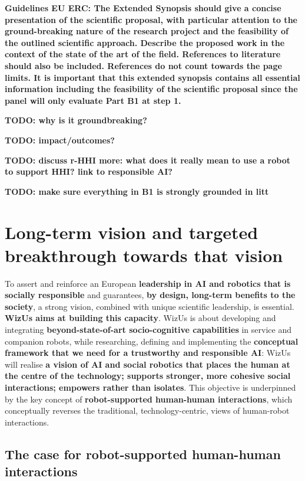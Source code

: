 \documentclass[11pt]{report}
\newcommand{\project}{WizUs\xspace}
\newcommand{\TODO}[1]{{\color{red}\textbf{TODO: #1}}}
\newcommand{\eu}[1]{{\color{teal}\textbf{Guidelines EU ERC: #1}}}
\begin{document}
\eu{The Extended Synopsis should give a concise presentation of the scientific
proposal, with particular attention to the ground-breaking nature of the
research project and the feasibility of the outlined scientific approach.
Describe the proposed work in the context of the state of the art of the field.
References to literature should also be included. References do not count
towards the page limits. It is important that this extended synopsis contains
all essential information including the feasibility of the scientific proposal
since the panel will only evaluate Part B1 at step 1.}

\TODO{why is it groundbreaking?}

\TODO{impact/outcomes?}

\TODO{discuss r-HHI more: what does it really mean to use a robot to support
HHI? link to responsible AI?}

\TODO{make sure everything in B1 is strongly grounded in litt}

\section{Long-term vision and targeted breakthrough towards that vision}

To assert and reinforce an European \textbf{leadership in AI and robotics that
is socially responsible} and guarantees, \textbf{by design, long-term benefits
to the society}, a strong vision, combined with unique scientific leadership, is
essential.  \textbf{\project aims at building this capacity}. \project is about
developing and integrating \textbf{beyond-state-of-art socio-cognitive
capabilities} in service and companion robots, while researching, defining and
implementing the \textbf{conceptual framework that we need for a trustworthy and
responsible AI}: \project will realise \textbf{a vision of AI and social
robotics that places the human at the centre of the technology; supports
stronger, more cohesive social interactions; empowers rather than isolates}.
This objective is underpinned by the key concept of \textbf{robot-supported
human-human interactions}, which conceptually reverses the traditional, technology-centric,
views of human-robot interactions.




\subsection{The case for robot-supported human-human interactions}
\end{document}

